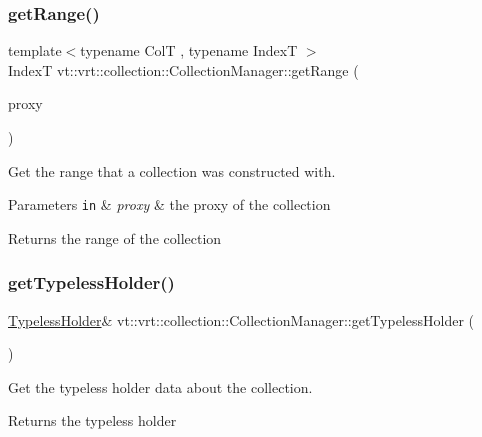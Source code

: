 \subsubsection{\texorpdfstring{get\+Range()}{getRange()}}
{\footnotesize\ttfamily template$<$typename ColT , typename IndexT $>$ \\
IndexT vt\+::vrt\+::collection\+::\+Collection\+Manager\+::get\+Range (\begin{DoxyParamCaption}\item[{\hyperlink{namespacevt_a1b417dd5d684f045bb58a0ede70045ac}{Virtual\+Proxy\+Type}}]{proxy }\end{DoxyParamCaption})}



Get the range that a collection was constructed with. 


\begin{DoxyParams}[1]{Parameters}
\mbox{\tt in}  & {\em proxy} & the proxy of the collection\\
\hline
\end{DoxyParams}
\begin{DoxyReturn}{Returns}
the range of the collection 
\end{DoxyReturn}
\mbox{\label{structvt_1_1vrt_1_1collection_1_1_collection_manager_ac6a8ac3b0b5583f426932e95012f8332}} 
\subsubsection{\texorpdfstring{get\+Typeless\+Holder()}{getTypelessHolder()}}
{\footnotesize\ttfamily \hyperlink{structvt_1_1vrt_1_1collection_1_1_typeless_holder}{Typeless\+Holder}\& vt\+::vrt\+::collection\+::\+Collection\+Manager\+::get\+Typeless\+Holder (\begin{DoxyParamCaption}{ }\end{DoxyParamCaption})\hspace{0.3cm}{\ttfamily [inline]}}



Get the typeless holder data about the collection. 

\begin{DoxyReturn}{Returns}
the typeless holder 
\end{DoxyReturn}
\mbox{\label{structvt_1_1vrt_1_1collection_1_1_collection_manager_a79fb70bedfb02bc57ae4280345dd9427}} 
